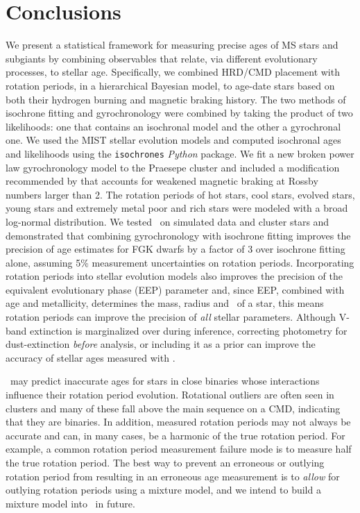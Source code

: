 \section{Conclusions}
\label{section:conclusion}

We present a statistical framework for measuring precise ages of MS stars and
subgiants by combining observables that relate, via different evolutionary
processes, to stellar age.
Specifically, we combined HRD/CMD placement with rotation periods, in a
hierarchical Bayesian model, to age-date stars based on both their hydrogen
burning and magnetic braking history.
The two methods of isochrone fitting and gyrochronology were combined by
taking the product of two likelihoods: one that contains an isochronal model
and the other a gyrochronal one.
We used the MIST stellar evolution models and computed isochronal ages and
likelihoods using the {\tt isochrones} {\it Python} package.
We fit a new broken power law gyrochronology model to the Praesepe cluster
and included a modification recommended by \citet{vansaders2016} that accounts
for weakened magnetic braking at Rossby numbers larger than 2.
The rotation periods of hot stars, cool stars, evolved stars, young stars and
extremely metal poor and rich stars were modeled with a broad log-normal
distribution.
We tested \sd\ on simulated data and cluster stars and demonstrated that
combining gyrochronology with isochrone fitting improves the precision of age
estimates for FGK dwarfs by a factor of 3 over isochrone fitting alone,
assuming 5\% measurement uncertainties on rotation periods.
Incorporating rotation periods into stellar evolution models also improves the
precision of the equivalent evolutionary phase (EEP) parameter and, since EEP,
combined with age and metallicity, determines the mass, radius and \logg\ of a
star, this means rotation periods can improve the precision of {\it all}
stellar parameters.
Although V-band extinction is marginalized over during inference, correcting
photometry for dust-extinction {\it before} analysis, or including it as a
prior can improve the accuracy of stellar ages measured with \sd.

\sd\ may predict inaccurate ages for stars in close binaries whose
interactions influence their rotation period evolution.
Rotational outliers are often seen in clusters \citep[see \eg][]{douglas2016,
rebull2016, douglas2017, rebull2017} and many of these fall above the main
sequence on a CMD, indicating that they are binaries.
In addition, measured rotation periods may not always be accurate and can, in
many cases, be a harmonic of the true rotation period.
For example, a common rotation period measurement failure mode is to measure
half the true rotation period.
The best way to prevent an erroneous or outlying rotation period from
resulting in an erroneous age measurement is to {\it allow} for outlying
rotation periods using a mixture model, and we intend to build a mixture model
into \sd\ in future.

